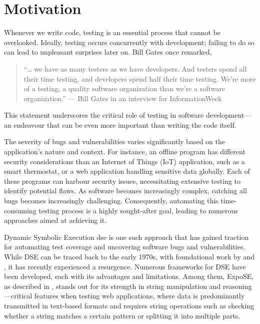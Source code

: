 
\section{Motivation}
\label{sec:motivation}

Whenever we write code, testing is an essential process that cannot be overlooked. Ideally, testing occurs concurrently with development; failing to do so can lead to unpleasant surprises later on. Bill Gates once remarked, 
\begin{quote}

    “… we have as many testers as we have developers. And testers spend all their time testing, and developers spend half their time testing. We're more of a testing, a quality software organization than we're a software organization.” — Bill Gates in an interview for InformationWeek \cite{bill_q_2002} 
\end{quote}

This statement underscores the critical role of testing in software development—an endeavour that can be even more important than writing the code itself.

The severity of bugs and vulnerabilities varies significantly based on the application's nature and context. For instance, an offline program has different security considerations than an Internet of Things (IoT) application, such as a smart thermostat, or a web application handling sensitive data globally. Each of these programs can harbour security issues, necessitating extensive testing to identify potential flaws. As software becomes increasingly complex, catching all bugs becomes increasingly challenging. Consequently, automating this time-consuming testing process is a highly sought-after goal, leading to numerous approaches aimed at achieving it.

Dynamic Symbolic Execution \gls{dse} is one such approach that has gained traction for automating test coverage and uncovering software bugs and vulnerabilities. While DSE can be traced back to the early 1970s, with foundational work by \citet{boyer_selectformal_1975} and \citet{king_new_1975}, it has recently experienced a resurgence. Numerous frameworks for DSE have been developed, each with its advantages and limitations. Among them, ExpoSE, as described in \citet{loring_expose_2017}, stands out for its strength in string manipulation and reasoning—critical features when testing web applications, where data is predominantly transmitted in text-based formats and requires string operations such as checking whether a string matches a certain pattern or splitting it into multiple parts.

